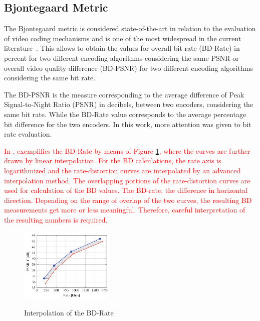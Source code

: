 \documentclass{acm_proc_article-sp}
\begin{document}
\subsection{Bjontegaard Metric}

The Bjontegaard metric is considered state-of-the-art in relation to the evaluation of video coding mechanisms and is one of the most widespread in the current literature~\cite{Bjontegaard:01}\cite{Mathias}. This allows to obtain the values for overall bit rate (BD-Rate) in percent for two different encoding algorithms
considering the same PSNR or overall video quality difference (BD-PSNR) for two different encoding algorithms considering the same bit rate. %
	
The BD-PSNR is the measure corresponding to the average difference of Peak Signal-to-Night Ratio (PSNR) in decibels, between two encoders, considering the same bit rate. While the BD-Rate value corresponds to the average percentage bit difference for the two encoders. In this work, more attention was given to bit rate evaluation.	

\textcolor{red}{
In \cite{Mathias}, exemplifies the BD-Rate by means of Figure \ref{fig:chart_barate}, where the curves are further drawn by linear interpolation. For the BD calculations, the rate axis is logarithmized and the rate-distortion curves are interpolated by an advanced interpolation method. The overlapping portions of the rate-distortion curves are used for calculation of the BD values. The BD-rate, the difference in horizontal direction. Depending on the range of overlap of the two curves, the resulting BD measurements get more or less meaningful. Therefore, careful interpretation of the resulting numbers is required.
}

\FloatBarrier
\begin{figure}[!ht]
	\centering
	\caption{Interpolation of the BD-Rate \cite{Mathias}}
	\includegraphics[width=0.4\textwidth]{figures/chartbdrate.png}
	\label{fig:chart_barate}
\end{figure}
\FloatBarrier
	
\end{document}
